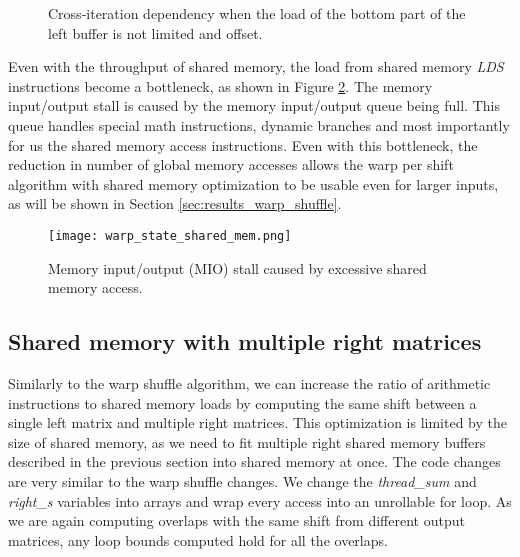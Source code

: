 \begin{figure}[ht]
	\centering
	\def\svgwidth{0.4\textwidth}
	\fontsize{8}{10}\selectfont
	
	\caption{Cross-iteration dependency when the load of the bottom part of the left buffer is not limited and offset.}
	\label{fig:left_buffer_no_preload}
\end{figure}

Even with the throughput of shared memory, the load from shared memory \textit{LDS} instructions become a bottleneck, as shown in Figure \ref{fig:warp_state_shared_mem}. The memory input/output stall is caused by the memory input/output queue being full. This queue handles special math instructions, dynamic branches and most importantly for us the shared memory access instructions. Even with this bottleneck, the reduction in number of global memory accesses allows the warp per shift algorithm with shared memory optimization to be usable even for larger inputs, as will be shown in Section \ref{sec:results_warp_shuffle}.

\begin{figure}[ht]
	\centering
	\texttt{[image: warp\_state\_shared\_mem.png]}
	\caption{Memory input/output (MIO) stall caused by excessive shared memory access.}
	\label{fig:warp_state_shared_mem}
\end{figure}

\subsection{Shared memory with multiple right matrices}

Similarly to the warp shuffle algorithm, we can increase the ratio of arithmetic instructions to shared memory loads by computing the same shift between a single left matrix and multiple right matrices. This optimization is limited by the size of shared memory, as we need to fit multiple right shared memory buffers described in the previous section into shared memory at once. The code changes are very similar to the warp shuffle changes. We change the \textit{thread\_sum} and \textit{right\_s} variables into arrays and wrap every access into an unrollable for loop. As we are again computing overlaps with the same shift from different output matrices, any loop bounds computed hold for all the overlaps.


